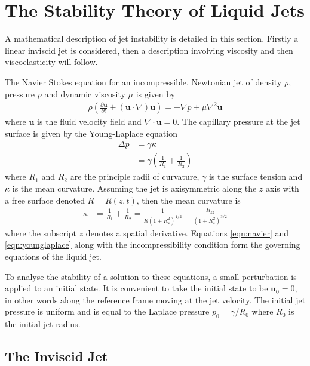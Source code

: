 \documentclass[11pt]{article}
\newcommand{\pd}[2]{\frac{\partial #1}{\partial #2}}
\begin{document}
\newpage

\section{The Stability Theory of Liquid Jets} \label{sec:stability}
A mathematical description of jet instability is detailed in this section. Firstly a linear inviscid jet is considered, then a description involving viscosity and then viscoelasticity will follow.

The Navier Stokes equation for an incompressible, Newtonian jet of density $\rho$, pressure $p$ and dynamic viscosity $\mu$ is given by
\begin{align}
\rho \left( \pd{\mathbf{u}}{t} + (\mathbf{u} \cdot \nabla) \mathbf{u} \right) = - \nabla p + \mu \nabla^2 \mathbf{u}
\label{eqn:navier}
\end{align}
where $\mathbf{u}$ is the fluid velocity field and $\nabla \cdot \mathbf{u} = 0$. The capillary pressure at the jet surface is given by the Young-Laplace equation
\begin{align}
\Delta p &= \gamma \kappa \nonumber \\
&= \gamma \left(\frac{1}{R_1} + \frac{1}{R_2} \right)
\label{eqn:younglaplace}
\end{align}
where $R_1$ and $R_2$ are the principle radii of curvature, $\gamma$ is the surface tension and $\kappa$ is the mean curvature. Assuming the jet is axisymmetric along the $z$ axis with a free surface denoted  $R = R(z,t)$, then the mean curvature is
\begin{align}
\kappa &= \frac{1}{R_1} + \frac{1}{R_2} = \frac{1}{R(1+ R_z^2)^{1/2}} - \frac{R_{zz}}{(1 + R_z^2)^{3/2}}
\label{eqn:curvature}
\end{align}
where the subscript $z$ denotes a spatial derivative. Equations \ref{eqn:navier} and \ref{eqn:younglaplace} along with the incompressibility condition form the governing equations of the liquid jet.

To analyse the stability of a solution to these equations, a small perturbation is applied to an initial state. It is convenient to take the initial state to be $\mathbf{u}_0 = 0$, in other words along the reference frame moving at the jet velocity. The initial jet pressure is uniform and is equal to the Laplace pressure $p_0 = \gamma / R_0$ where $R_0$ is the initial jet radius.

\subsection{The Inviscid Jet}
\end{document}
